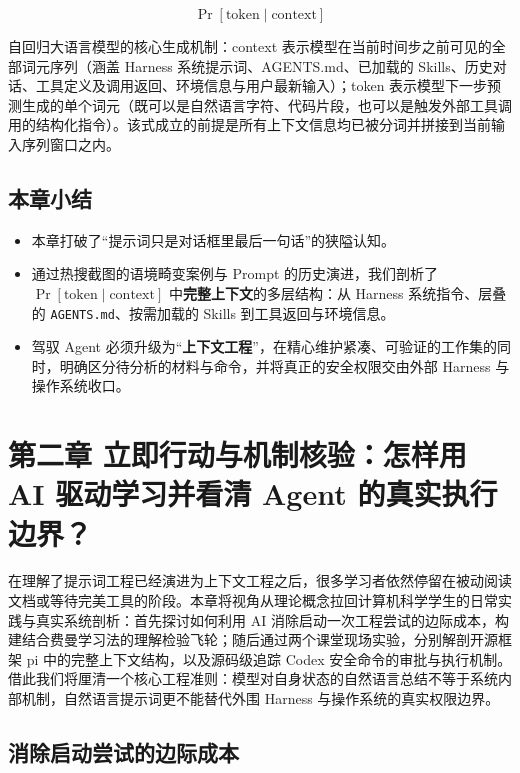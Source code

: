 \documentclass[UTF8,a4paper,11pt,fontset=fandol]{ctexart}
\begin{document}
\[
\Pr[\text{token} \mid \text{context}]
\]

自回归大语言模型的核心生成机制：context 表示模型在当前时间步之前可见的全部词元序列（涵盖 Harness 系统提示词、AGENTS.md、已加载的 Skills、历史对话、工具定义及调用返回、环境信息与用户最新输入）；token 表示模型下一步预测生成的单个词元（既可以是自然语言字符、代码片段，也可以是触发外部工具调用的结构化指令）。该式成立的前提是所有上下文信息均已被分词并拼接到当前输入序列窗口之内。

\subsection{本章小结}

\begin{itemize}
\item 本章打破了“提示词只是对话框里最后一句话”的狭隘认知。

\item 通过热搜截图的语境畸变案例与 Prompt 的历史演进，我们剖析了 \(\Pr[\text{token}\mid\text{context}]\) 中\textbf{完整上下文}的多层结构：从 Harness 系统指令、层叠的 \texttt{AGENTS.md}、按需加载的 Skills 到工具返回与环境信息。

\item 驾驭 Agent 必须升级为“\textbf{上下文工程}”，在精心维护紧凑、可验证的工作集的同时，明确区分待分析的材料与命令，并将真正的安全权限交由外部 Harness 与操作系统收口。
\end{itemize}

\section{第二章 立即行动与机制核验：怎样用 AI 驱动学习并看清 Agent 的真实执行边界？}

在理解了提示词工程已经演进为上下文工程之后，很多学习者依然停留在被动阅读文档或等待完美工具的阶段。本章将视角从理论概念拉回计算机科学学生的日常实践与真实系统剖析：首先探讨如何利用 AI 消除启动一次工程尝试的边际成本，构建结合费曼学习法的理解检验飞轮；随后通过两个课堂现场实验，分别解剖开源框架 pi 中的完整上下文结构，以及源码级追踪 Codex 安全命令的审批与执行机制。借此我们将厘清一个核心工程准则：模型对自身状态的自然语言总结不等于系统内部机制，自然语言提示词更不能替代外围 Harness 与操作系统的真实权限边界。

\subsection{消除启动尝试的边际成本}
\end{document}
